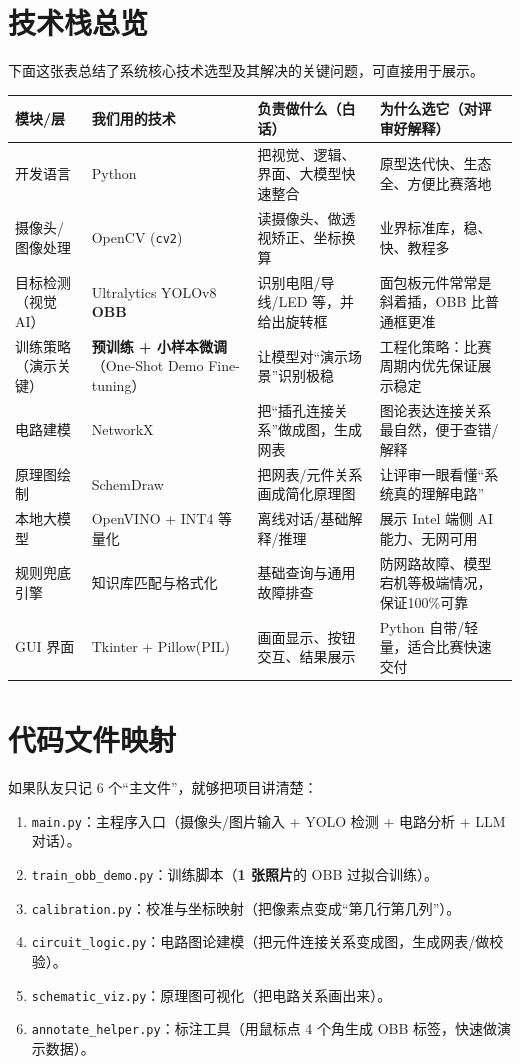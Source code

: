 \documentclass[a4paper,AutoFakeBold,oneside,12pt]{book}
\begin{document}
\section{技术栈总览}
下面这张表总结了系统核心技术选型及其解决的关键问题，可直接用于展示。

\begin{longtable}{|p{}|p{}|p{}|p{}|}
\hline
\textbf{模块/层} & \textbf{我们用的技术} & \textbf{负责做什么（白话）} & \textbf{为什么选它（对评审好解释）} \\ \hline
开发语言 & Python & 把视觉、逻辑、界面、大模型快速整合 & 原型迭代快、生态全、方便比赛落地 \\ \hline
摄像头/图像处理 & OpenCV (\texttt{cv2}) & 读摄像头、做透视矫正、坐标换算 & 业界标准库，稳、快、教程多 \\ \hline
目标检测（视觉 AI） & Ultralytics YOLOv8 \textbf{OBB} & 识别电阻/导线/LED 等，并给出旋转框 & 面包板元件常常是斜着插，OBB 比普通框更准 \\ \hline
训练策略（演示关键） & \textbf{预训练 + 小样本微调}（One-Shot Demo Fine-tuning） & 让模型对“演示场景”识别极稳 & 工程化策略：比赛周期内优先保证展示稳定 \\ \hline
电路建模 & NetworkX & 把“插孔连接关系”做成图，生成网表 & 图论表达连接关系最自然，便于查错/解释 \\ \hline
原理图绘制 & SchemDraw & 把网表/元件关系画成简化原理图 & 让评审一眼看懂“系统真的理解电路” \\ \hline
本地大模型 & OpenVINO + INT4 等量化 & 离线对话/基础解释/推理 & 展示 Intel 端侧 AI 能力、无网可用 \\ \hline
规则兜底引擎 & 知识库匹配与格式化 & 基础查询与通用故障排查 & 防网路故障、模型宕机等极端情况，保证100\%可靠 \\ \hline
GUI 界面 & Tkinter + Pillow(PIL) & 画面显示、按钮交互、结果展示 & Python 自带/轻量，适合比赛快速交付 \\ \hline
\end{longtable}

\section{代码文件映射}
如果队友只记 6 个“主文件”，就够把项目讲清楚：

\begin{enumerate}
    \item \texttt{main.py}：主程序入口（摄像头/图片输入 + YOLO 检测 + 电路分析 + LLM 对话）。
    \item \texttt{train\_obb\_demo.py}：训练脚本（\textbf{1 张照片}的 OBB 过拟合训练）。
    \item \texttt{calibration.py}：校准与坐标映射（把像素点变成“第几行第几列”）。
    \item \texttt{circuit\_logic.py}：电路图论建模（把元件连接关系变成图，生成网表/做校验）。
    \item \texttt{schematic\_viz.py}：原理图可视化（把电路关系画出来）。
    \item \texttt{annotate\_helper.py}：标注工具（用鼠标点 4 个角生成 OBB 标签，快速做演示数据）。
\end{enumerate}
\end{document}
